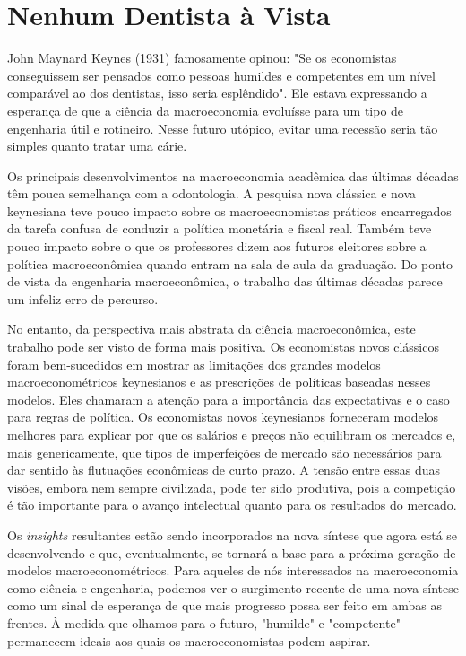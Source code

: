 \documentclass[12pt]{article}
\begin{document}
\section{Nenhum Dentista à Vista}

John Maynard Keynes (1931) famosamente opinou: "Se os economistas conseguissem ser pensados como pessoas humildes e competentes em um nível comparável ao dos dentistas, isso seria esplêndido". Ele estava expressando a esperança de que a ciência da macroeconomia evoluísse para um tipo de engenharia útil e rotineiro. Nesse futuro utópico, evitar uma recessão seria tão simples quanto tratar uma cárie.

Os principais desenvolvimentos na macroeconomia acadêmica das últimas décadas têm pouca semelhança com a odontologia. A pesquisa nova clássica e nova keynesiana teve pouco impacto sobre os macroeconomistas práticos encarregados da tarefa confusa de conduzir a política monetária e fiscal real. Também teve pouco impacto sobre o que os professores dizem aos futuros eleitores sobre a política macroeconômica quando entram na sala de aula da graduação. Do ponto de vista da engenharia macroeconômica, o trabalho das últimas décadas parece um infeliz erro de percurso.

No entanto, da perspectiva mais abstrata da ciência macroeconômica, este trabalho pode ser visto de forma mais positiva. Os economistas novos clássicos foram bem-sucedidos em mostrar as limitações dos grandes modelos macroeconométricos keynesianos e as prescrições de políticas baseadas nesses modelos. Eles chamaram a atenção para a importância das expectativas e o caso para regras de política. Os economistas novos keynesianos forneceram modelos melhores para explicar por que os salários e preços não equilibram os mercados e, mais genericamente, que tipos de imperfeições de mercado são necessários para dar sentido às flutuações econômicas de curto prazo. A tensão entre essas duas visões, embora nem sempre civilizada, pode ter sido produtiva, pois a competição é tão importante para o avanço intelectual quanto para os resultados do mercado.

Os \textit{insights} resultantes estão sendo incorporados na nova síntese que agora está se desenvolvendo e que, eventualmente, se tornará a base para a próxima geração de modelos macroeconométricos. Para aqueles de nós interessados na macroeconomia como ciência e engenharia, podemos ver o surgimento recente de uma nova síntese como um sinal de esperança de que mais progresso possa ser feito em ambas as frentes. À medida que olhamos para o futuro, "humilde" e "competente" permanecem ideais aos quais os macroeconomistas podem aspirar.
\end{document}
